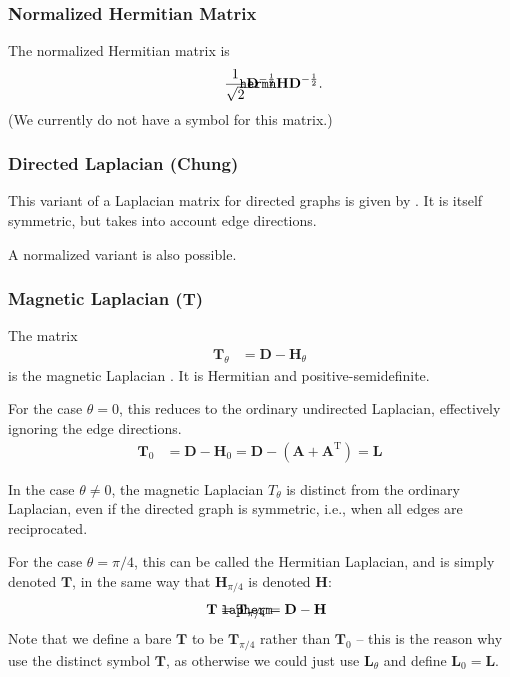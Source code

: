 \documentclass{article}
\def\mathnote#1{%
  \tag*{\rlap{\hspace\marginparsep\smash{\parbox[t]{\marginparwidth}{#1}}}}
}
\begin{document}
\subsubsection{Normalized Hermitian Matrix}
The normalized Hermitian matrix is
\begin{align}
  \mathnote{\texttt{hermn}}
  \frac 1{\sqrt 2} \mathbf D^{-\frac 1 2} \mathbf H \mathbf D^{-\frac 1 2}. 
\end{align}
(We currently do not have a symbol for this matrix.)

\subsubsection{Directed Laplacian (Chung)}
This variant of a Laplacian matrix for directed graphs is given by
\cite{b264}.  It is itself symmetric, but takes into account edge
directions. 

A normalized variant is also possible.  

\subsubsection{Magnetic Laplacian ($\mathbf T$)}
The matrix
\begin{align}
  \mathbf T_{\theta} &= \mathbf D - \mathbf H_{\theta} 
\end{align}
is the magnetic Laplacian \citep{b903}.  It is Hermitian and positive-semidefinite.   

For the case $\theta = 0$, this reduces to the ordinary undirected
Laplacian, effectively ignoring the edge directions.
\begin{align}
  \mathbf T_{0} &= \mathbf D - \mathbf H_{0} = \mathbf D - (\mathbf A + \mathbf A^{\mathrm T}) = \mathbf L
\end{align}

In the case $\theta \neq 0$, the magnetic Laplacian $T_{\theta}$ is
distinct from the ordinary Laplacian, even if the directed graph is
symmetric, i.e., when all edges are reciprocated. 

For the case $\theta = \pi/4$, this can be called the Hermitian
Laplacian, and is simply denoted $\mathbf T$, in the same way that
$\mathbf H_{\pi/4}$ is denoted $\mathbf H$:
\begin{align}
  \mathnote{\texttt{lapherm}}
  \mathbf T &= \mathbf T_{\pi/4} = \mathbf D - \mathbf H
\end{align}
Note that we define a bare $\mathbf T$ to be $\mathbf T_{\pi/4}$ rather
than $\mathbf T_0$ -- this is the reason why use the distinct symbol
$\mathbf T$, as otherwise we could just use $\mathbf L_{\theta}$ and define
$\mathbf L_0 = \mathbf L$. 
\end{document}
